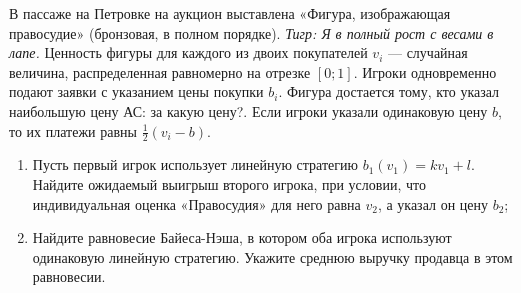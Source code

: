 \begin{problem}
В пассаже на Петровке на аукцион выставлена «Фигура, изображающая правосудие» (бронзовая, в полном порядке). {\it Тигр: Я в полный рост с весами в лапе.} Ценность фигуры для каждого из двоих покупателей  $v_{i} $  — случайная величина, распределенная равномерно на отрезке  $\left[0;1\right]$. Игроки одновременно подают заявки с указанием цены покупки  $b_{i} $. Фигура достается тому, кто указал наибольшую цену {\red АС: за какую цену?}. Если игроки указали одинаковую цену  $b$, то их платежи равны  $\frac{1}{2} \left(v_{i} -b\right)$.\par
\begin{enumerate}
\item Пусть первый игрок использует линейную стратегию  $b_{1} \left(v_{1} \right)=kv_{1} +l$. Найдите ожидаемый выигрыш второго игрока, при условии, что индивидуальная оценка «Правосудия» для него равна  $v_{2} $, а указал он цену  $b_{2}$;\par
\item 	Найдите равновесие Байеса-Нэша, в котором оба игрока используют одинаковую линейную стратегию. Укажите среднюю выручку продавца в этом равновесии.\par
\end{enumerate}


\begin{sol}

\end{sol}
\end{problem}

